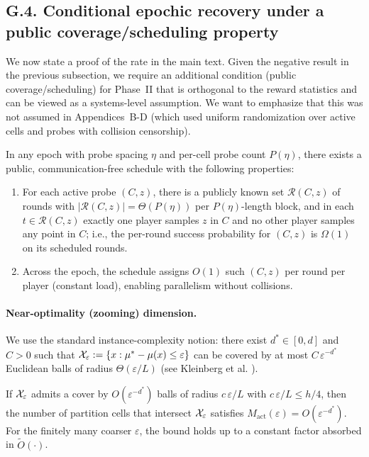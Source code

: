 \subsection*{G.4.\; Conditional epochic recovery under a public coverage/scheduling property}
\label{subsec:conditional-recovery}

We now state a proof of the rate in the main text. Given the negative result in the previous subsection, we require an additional condition (public coverage/scheduling) for Phase~II that is orthogonal to the reward statistics and can be viewed as a systems-level assumption.
We want to emphasize that this was not assumed in Appendices~B-D (which used uniform randomization over active cells and probes with collision censorship).

\begin{assumption}
\label{ass:coverage}
In any epoch with probe spacing $\eta$ and per-cell probe count $P(\eta)$, there exists a public, communication-free schedule with the following properties:
\begin{enumerate}[label=(\alph*)]
\item For each active probe $(C,z)$, there is a publicly known set $\mathcal{R}(C,z)$ of rounds with $|\mathcal{R}(C,z)|=\Theta(P(\eta))$ per $P(\eta)$-length block, and in each $t\in\mathcal{R}(C,z)$ exactly one player samples $z$ in $C$ and no other player samples any point in $C$; i.e., the per-round success probability for $(C,z)$ is $\Omega(1)$ on its scheduled rounds.
\item Across the epoch, the schedule assigns $O(1)$ such $(C,z)$ per round per player (constant load), enabling parallelism without collisions.
\end{enumerate}
\end{assumption}

\paragraph{Near-optimality (zooming) dimension.}
We use the standard instance-complexity notion: there exist $d^{*}\in[0,d]$ and $C>0$ such that $\mathcal{X}_\varepsilon:=\{x:\mu^{*}-\mu(x)\le \varepsilon\}$ can be covered by at most $C\,\varepsilon^{-d^{*}}$ Euclidean balls of radius $\Theta(\varepsilon/L)$ (see Kleinberg et al. \citep{Kleinberg}).

\begin{lemma}
\label{lem:Mact-dstar}
If $\mathcal{X}_\varepsilon$ admits a cover by $O(\varepsilon^{-d^{*}})$ balls of radius $c\,\varepsilon/L$ with $c\,\varepsilon/L\le h/4$, then the number of partition cells that intersect $\mathcal{X}_\varepsilon$ satisfies $M_{\mathrm{act}}(\varepsilon)=O(\varepsilon^{-d^{*}})$. For the finitely many coarser $\varepsilon$, the bound holds up to a constant factor absorbed in $\tilde O(\cdot)$.
\end{lemma}

